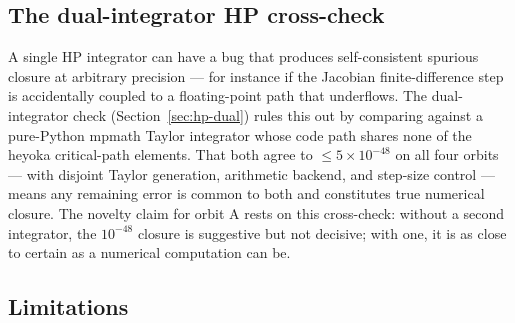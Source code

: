 \documentclass[11pt]{article}
\begin{document}
\subsection{The dual-integrator HP cross-check}

A single HP integrator can have a bug that produces self-consistent
spurious closure at arbitrary precision --- for instance if the
Jacobian finite-difference step is accidentally coupled to a
floating-point path that underflows. The dual-integrator check
(Section~\ref{sec:hp-dual}) rules this out by comparing against a
pure-Python mpmath Taylor integrator whose code path shares none of
the heyoka critical-path elements. That both agree to
$\le\!5\!\times\!10^{-48}$ on all four orbits --- with disjoint Taylor
generation, arithmetic backend, and step-size control --- means any
remaining error is common to both and constitutes true numerical
closure. The novelty claim for orbit A rests on this cross-check:
without a second integrator, the $10^{-48}$ closure is suggestive but
not decisive; with one, it is as close to certain as a
numerical computation can be.

\subsection{Limitations}
\end{document}
